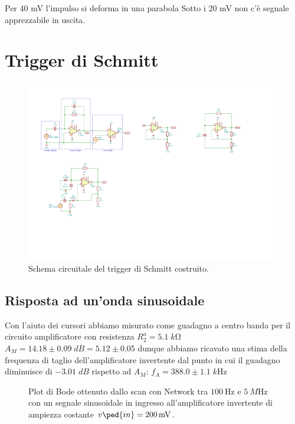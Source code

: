 \documentclass[10pt,a4paper]{article}
\begin{document}
Per 40 mV l'impulso si deforma in una parabola
Sotto i 20 mV non c'è segnale apprezzabile in uscita.

\section{Trigger di Schmitt}

\begin{figure}[htbp]
    \centering
	\includegraphics[scale=1.5]{trgSchmitt}
    \caption{Schema circuitale del trigger di Schmitt costruito.
    \label{fig: trgschmittschm}}
\end{figure}

\subsection{Risposta ad un'onda sinusoidale}
Con l'aiuto dei cursori abbiamo misurato come guadagno a centro banda
per il circuito amplificatore con resistenza $R_2^a = 5.1 \; \si{k\ohm}$
$A_M = 14.18 \pm 0.09 \; \si{dB} = 5.12 \pm 0.05$
dunque abbiamo ricavato una stima della frequenza di taglio dell'amplificatore
invertente dal punto in cui il guadagno diminuisce di $-3.01 \; \si{dB}$
rispetto ad $A_M$:
$f_A = 388.0 \pm 1.1 \; \si{k\Hz}$
\begin{figure}[htbp]
\centering
\caption{Plot di Bode ottenuto dallo scan con Network tra $\SI{100}{\Hz}$ e
$\SI{5}{M\Hz}$ con un segnale sinusoidale in ingresso all'amplificatore
invertente di ampiezza costante $v\ped{in} = \SI{200}{m\V}$. \label{fig: 
invbode}}
\end{figure}
\end{document}
